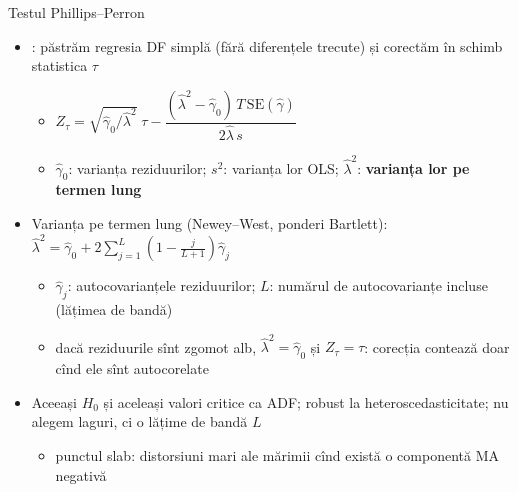 \begin{frame}{Testul Phillips--Perron}
\itemsize{\small}
\begin{itemize}
    \item {}: păstrăm regresia DF simplă (fără diferențele trecute) și corectăm în schimb statistica $\tau$
    \begin{itemize}
        \item $Z_\tau = \sqrt{\hat\gamma_0/\hat\lambda^2}\;\tau - \dfrac{(\hat\lambda^2 - \hat\gamma_0)\,T\,\mathrm{SE}(\hat\gamma)}{2\hat\lambda\,s}$
        \item $\hat\gamma_0$: varianța reziduurilor; $s^2$: varianța lor OLS; $\hat\lambda^2$: \textbf{varianța lor pe termen lung}
    \end{itemize}
    \item Varianța pe termen lung (Newey--West, ponderi Bartlett): $\hat\lambda^2 = \hat\gamma_0 + 2\sum_{j=1}^{L}(1 - \frac{j}{L+1})\hat\gamma_j$
    \begin{itemize}
        \item $\hat\gamma_j$: autocovarianțele reziduurilor; $L$: numărul de autocovarianțe incluse (lățimea de bandă)
        \item dacă reziduurile sînt zgomot alb, $\hat\lambda^2 = \hat\gamma_0$ și $Z_\tau = \tau$: corecția contează doar cînd ele sînt autocorelate
    \end{itemize}
    \item Aceeași $H_0$ și aceleași valori critice ca ADF; robust la heteroscedasticitate; nu alegem laguri, ci o lățime de bandă $L$
    \begin{itemize}
        \item punctul slab: distorsiuni mari ale mărimii cînd există o componentă MA negativă 
    \end{itemize}
\end{itemize}
\end{frame}

